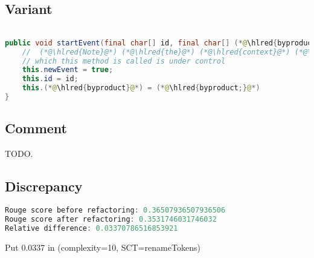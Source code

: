 \documentclass[11pt]{article}
\DeclareRobustCommand{\hlred}[1]{{\sethlcolor{YellowOrange}\hl{#1}}}
\begin{document}
  \subsection{Variant}

  \begin{lstlisting}[language=java]

public void startEvent(final char[] id, final char[] (*@\hlred{byproduct}@*)) {
    //  (*@\hlred{Note}@*) (*@\hlred{the}@*) (*@\hlred{context}@*) (*@\hlred{in}@*) (*@\hlred{that }@*)this (*@\hlred{method}@*) (*@\hlred{or}@*) (*@\hlred{context}@*) (*@\hlred{in}@*) (*@\hlred{other}@*) (*@\hlred{code}@*) is (*@\hlred{ignored}@*) (*@\hlred{since}@*) (*@\hlred{only}@*) (*@\hlred{that}@*) (*@\hlred{method called}@*)
    // which this method is called is under control
    this.newEvent = true;
    this.id = id;
    this.(*@\hlred{byproduct}@*) = (*@\hlred{byproduct;}@*)
}
  \end{lstlisting}

  \subsection{Comment}

  TODO.

  \subsection{Discrepancy}

  \begin{lstlisting}[language=java]
Rouge score before refactoring: 0.36507936507936506
Rouge score after refactoring: 0.3531746031746032
Relative difference: 0.03370786516853921
  \end{lstlisting}

  Put 0.0337 in (complexity=10, SCT=renameTokens)
\end{document}
